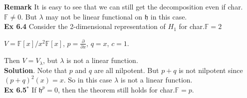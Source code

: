 \documentclass[12pt,a4paper]{article}
\begin{document}
\noindent \textbf{Remark} It is easy to see that we can still get
the decomposition even if char.$\mathbb{F}\neq 0$.
But $\lambda$ may not be linear functional on $\mathfrak{h}$ in this case.\\

\noindent \textbf{Ex 6.4} Consider the 2-dimensional
representation of $H_{1}$ for char.$\mathbb{F}=2$
\begin{center}
$V=\mathbb{F}[x]/x^{2}\mathbb{F}[x]$, $p=\frac{\partial}{\partial
x}$, $q=x$, $c=1$.
\end{center}
Then $V=V_{\lambda}$, but $\lambda$ is not a linear function.\\
\textbf{Solution}. Note that $p$ and $q$ are all nilpotent. But
$p+q$ is not nilpotent since $(p+q)^{2}(x)=x$. So in this case
$\lambda$ is not a linear function.\\

 \noindent \textbf{Ex 6.5}$^{*}$ If
$\mathfrak{h}^{p}=0$, then the theorem still holds for
char.$\mathbb{F}=p$.
\end{document}
